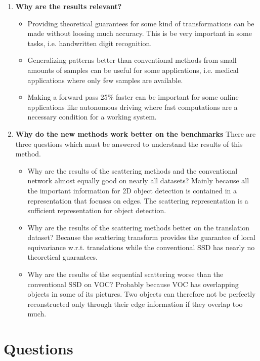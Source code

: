 \documentclass[a4paper,12pt]{scrartcl}
\begin{document}
\begin{enumerate}
	\item \textbf{Why are the results relevant?} 
	\begin{itemize}
		\item Providing theoretical guarantees for some kind of transformations can be made without loosing much accuracy. This is be very important in some tasks, i.e. handwritten digit recognition.
		\item Generalizing patterns better than conventional methods from small amounts of samples can be useful for some applications, i.e. medical applications where only few samples are available.
		\item Making a forward pass 25\% faster can be important for some online applications like autonomous driving where fast computations are a necessary condition for a working system.
	\end{itemize}
	\item \textbf{Why do the new methods work better on the benchmarks}
	There are three questions which must be answered to understand the results of this method.
	\begin{itemize}
		\item Why are the results of the scattering methods and the conventional network almost equally good on nearly all datasets? Mainly because all the important information for 2D object detection is contained in a representation that focuses on edges. The scattering representation is a sufficient representation for object detection. 
		\item Why are the results of the scattering methods better on the translation dataset? Because the scattering transform provides the guarantee of local equivariance w.r.t. translations while the conventional SSD has nearly no theoretical guarantees. 
		\item Why are the results of the sequential scattering worse than the conventional SSD on VOC? Probably because VOC has overlapping objects in some of its pictures. Two objects can therefore not be perfectly reconstructed only through their edge information if they overlap too much. 
	\end{itemize}
\end{enumerate}

\section{Questions}
\end{document}
